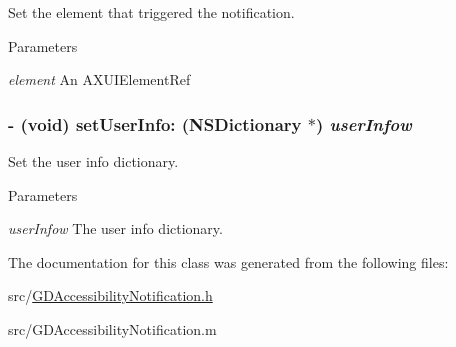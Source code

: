 Set the element that triggered the notification. 
\begin{DoxyParams}{Parameters}
\item[{\em element}]An AXUIElementRef \end{DoxyParams}
\hypertarget{interface_g_d_accessibility_notification_ac44eebad792940c9f430ab0274f0dedf}{
\subsubsection[{setUserInfo:}]{\setlength{\rightskip}{0pt plus 5cm}-\/ (void) setUserInfo: (NSDictionary $\ast$) {\em userInfow}}}
\label{interface_g_d_accessibility_notification_ac44eebad792940c9f430ab0274f0dedf}


Set the user info dictionary. 
\begin{DoxyParams}{Parameters}
\item[{\em userInfow}]The user info dictionary. \end{DoxyParams}


The documentation for this class was generated from the following files:\begin{DoxyCompactItemize}
\item 
src/\hyperlink{_g_d_accessibility_notification_8h}{GDAccessibilityNotification.h}\item 
src/GDAccessibilityNotification.m\end{DoxyCompactItemize}
